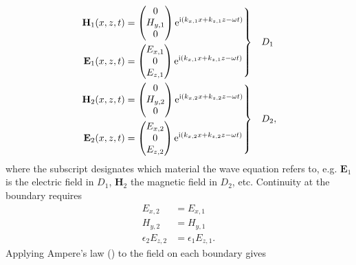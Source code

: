 \begin{align}
\left.\begin{aligned}
\mathbf{H}_1(x,z,t) &=
\begin{pmatrix}
0\\
H_{y,1}\\
0
\end{pmatrix} {\mathrm{e}}^{{\mathrm{i}}(k_{x,1}x+k_{z,1}z-\omega t)}\\
\mathbf{E}_1(x,z,t) &=
\begin{pmatrix}
E_{x,1}\\
0\\
E_{z,1}\\
\end{pmatrix} {\mathrm{e}}^{{\mathrm{i}}(k_{x,1}x+k_{z,1}z-\omega t)}
\end{aligned}
\right\}& \quad D_1\label{eqn:planewavedielectric}\\
\left.\begin{aligned}
\mathbf{H}_2(x,z,t) &=
\begin{pmatrix}
0\\
H_{y,2}\\
0
\end{pmatrix}
{\mathrm{e}}^{{\mathrm{i}}(k_{x,2}x+k_{z,2}z-\omega t)}\\
\mathbf{E}_2(x,z,t) &=
\begin{pmatrix}
E_{x,2}\\
0\\
E_{z,2}\\
\end{pmatrix}
{\mathrm{e}}^{{\mathrm{i}}(k_{x,2}x+k_{z,2}z-\omega t)}
\end{aligned} 
\right\}&\quad D_2,
\label{eqn:planewavemetal}
\end{align}
where the subscript designates which material the wave equation refers to,
e.g. $\mathbf{E}_1$ is the electric field in $D_1$, $\mathbf{H}_2$
the magnetic field in $D_2$, etc. Continuity at the boundary 
requires
\begin{align}
E_{x,2}&=E_{x,1}\\
H_{y,2}&=H_{y,1}\\
\epsilon_2 E_{z,2}&=\epsilon_1 E_{z,1}.
\end{align}
Applying Ampere's law () to the field on 
each boundary gives
